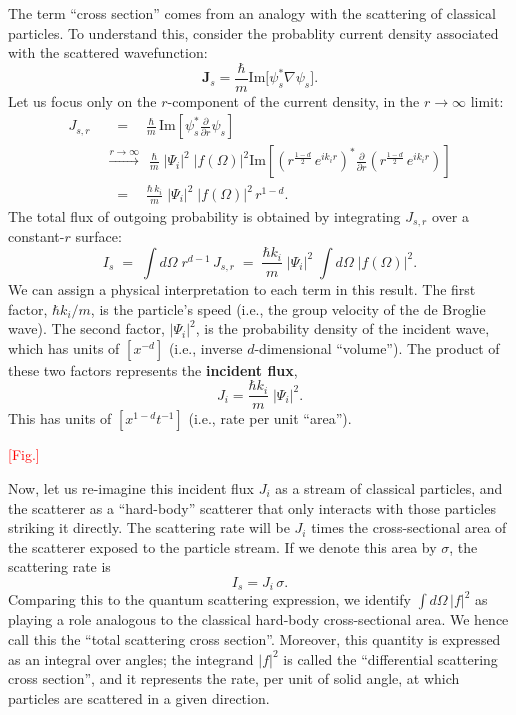 \documentclass[pra,11pt]{revtex4}
\begin{document}
The term ``cross section'' comes from an analogy with the scattering
of classical particles.  To understand this, consider the probablity
current density associated with the scattered wavefunction:
$$\mathbf{J}_s = \frac{\hbar}{m} \mathrm{Im}\big[\psi_s^*\nabla\psi_s\big].$$
Let us focus only on the $r$-component of the current density, in the
$r\rightarrow\infty$ limit:
$$\begin{aligned}J_{s,r}\; &\;\;=\;\;\;\, \frac{\hbar}{m}\, \mathrm{Im}\left[\psi_s^* \frac{\partial}{\partial r}\psi_s\right] \\ &\overset{r\rightarrow\infty}{\longrightarrow}\;\, \frac{\hbar}{m}\; |\Psi_i|^2 \; |f(\Omega)|^2 \mathrm{Im}\left[\left(r^{\frac{1-d}{2}} \, e^{ik_ir}\right)^* \frac{\partial}{\partial r} \left(r^{\frac{1-d}{2}} \, e^{ik_ir}\right)\right] \\ & \;\;=\;\;\;\, \frac{\hbar \,k_i}{m}\; |\Psi_i|^2 \; |f(\Omega)|^2 \,r^{1-d}.\end{aligned}$$
The total flux of outgoing probability is obtained by integrating
$J_{s,r}$ over a constant-$r$ surface:
$$I_s \;=\; \int d\Omega\; r^{d-1} \, J_{s,r} \;=\; \frac{\hbar k_i}{m} \;|\Psi_i|^2 \; \int d\Omega\; \big|f(\Omega)\big|^2.$$
We can assign a physical interpretation to each term in this
result.  The first factor, $\hbar k_i/m$, is the
particle's speed (i.e., the group velocity of the de Broglie wave).
The second factor, $|\Psi_i|^2$, is the probability density of the incident
wave, which has units of $[x^{-d}]$ (i.e., inverse $d$-dimensional
``volume'').  The product of these two factors represents the
\textbf{incident flux},
$$J_{i} = \frac{\hbar k_i}{m} \;|\Psi_i|^2.$$
This has units of $[x^{1-d}t^{-1}]$ (i.e., rate per unit ``area'').

\textcolor{red}{[Fig.]}

Now, let us re-imagine this incident flux $J_i$ as a stream of
classical particles, and the scatterer as a ``hard-body'' scatterer
that only interacts with those particles striking it directly.  The
scattering rate will be $J_{i}$ times the cross-sectional area of the
scatterer exposed to the particle stream.  If we denote this area by
$\sigma$, the scattering rate is
$$I_s = J_i \, \sigma.$$
Comparing this to the quantum scattering expression, we identify $\int
d\Omega\,|f|^2$ as playing a role analogous to the classical hard-body
cross-sectional area.  We hence call this the ``total scattering cross
section''.  Moreover, this quantity is expressed as an integral over
angles; the integrand $|f|^2$ is called the ``differential scattering
cross section'', and it represents the rate, per unit of solid angle,
at which particles are scattered in a given direction.
\end{document}
